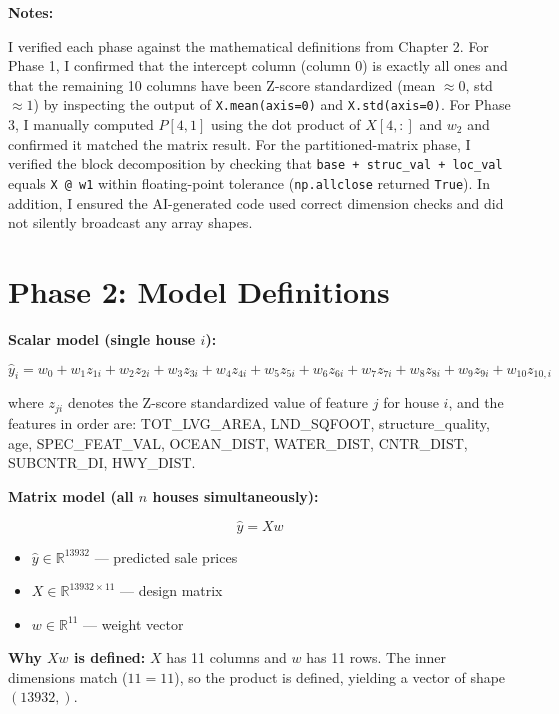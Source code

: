 \documentclass[11pt]{article}
\begin{document}
\textbf{Notes:}

I verified each phase against the mathematical definitions from Chapter 2. For Phase 1, I confirmed that the intercept column (column 0) is exactly all ones and that the remaining 10 columns have been Z-score standardized (mean $\approx 0$, std $\approx 1$) by inspecting the output of \texttt{X.mean(axis=0)} and \texttt{X.std(axis=0)}. For Phase 3, I manually computed $P[4,1]$ using the dot product of $X[4,:]$ and $w_2$ and confirmed it matched the matrix result. For the partitioned-matrix phase, I verified the block decomposition by checking that \texttt{base + struc\_val + loc\_val} equals \texttt{X @ w1} within floating-point tolerance (\texttt{np.allclose} returned \texttt{True}). In addition, I ensured the AI-generated code used correct dimension checks and did not silently broadcast any array shapes.

\section{Phase 2: Model Definitions}

\textbf{Scalar model (single house $i$):}

\[
\hat{y}_i = w_0 + w_1 z_{1i} + w_2 z_{2i} + w_3 z_{3i} + w_4 z_{4i} + w_5 z_{5i}
           + w_6 z_{6i} + w_7 z_{7i} + w_8 z_{8i} + w_9 z_{9i} + w_{10} z_{10,i}
\]

where $z_{ji}$ denotes the Z-score standardized value of feature $j$ for house $i$, and the features in order are: TOT\_LVG\_AREA, LND\_SQFOOT, structure\_quality, age, SPEC\_FEAT\_VAL, OCEAN\_DIST, WATER\_DIST, CNTR\_DIST, SUBCNTR\_DI, HWY\_DIST.

\textbf{Matrix model (all $n$ houses simultaneously):}

\[
\hat{y} = Xw
\]

\begin{itemize}
    \item $\hat{y} \in \mathbb{R}^{13932}$ --- predicted sale prices
    \item $X \in \mathbb{R}^{13932 \times 11}$ --- design matrix
    \item $w \in \mathbb{R}^{11}$ --- weight vector
\end{itemize}

\textbf{Why $Xw$ is defined:} $X$ has 11 columns and $w$ has 11 rows. The inner dimensions match ($11 = 11$), so the product is defined, yielding a vector of shape $(13932,)$.
\end{document}
